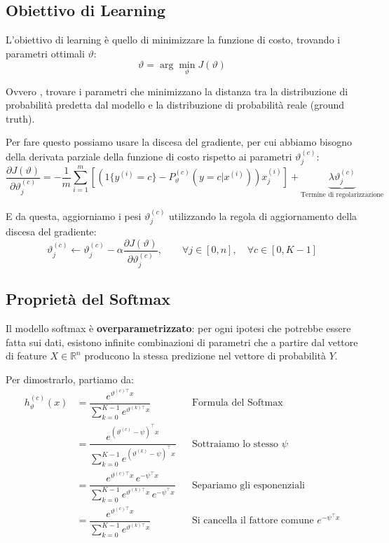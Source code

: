 \subsection{Obiettivo di Learning}
L'obiettivo di learning è quello di minimizzare la funzione di costo, trovando i parametri ottimali \(\vartheta\):
\[
\vartheta = \arg \min_{\vartheta} J(\vartheta)
\]

Ovvero , trovare i parametri che minimizzano la distanza tra la distribuzione di probabilità predetta dal modello e la distribuzione di probabilità reale (ground truth).

Per fare questo possiamo usare la discesa del gradiente, per cui abbiamo bisogno della derivata parziale della funzione di costo rispetto ai parametri \(\vartheta_j^{(c)}\):
\[
\frac{\partial J(\vartheta)}{\partial \vartheta_j^{(c)}}
=
- \frac{1}{m}
\sum_{i=1}^{m}
\left[
\left(1\{y^{(i)} = c\} - P_{\vartheta}^{(c)}(y=c | x^{(i)})\right)
x_j^{(i)}
\right]
+
\underbrace{\lambda \vartheta_j^{(c)}}_{\text{Termine di regolarizzazione}}
\]

E da questa, aggiorniamo i pesi \(\vartheta_j^{(c)}\) utilizzando la regola di aggiornamento della discesa del gradiente:
\[
\vartheta_j^{(c)} \leftarrow \vartheta_j^{(c)} - \alpha \frac{\partial J(\vartheta)}{\partial \vartheta_j^{(c)}}, \qquad \forall j \in [0, n], \quad \forall c \in [0, K-1]
\]

\subsection{Proprietà del Softmax}\label{sec:proprieta_softmax}
Il modello softmax è \textbf{overparametrizzato}: per ogni ipotesi che potrebbe essere fatta sui dati, esistono infinite combinazioni di parametri che a partire dal vettore di feature $X \in \mathbb{R}^n$ producono la stessa predizione nel vettore di probabilità $Y$.

\noindent
Per dimostrarlo, partiamo da:
\begin{align*}
h_{\vartheta}^{(c)}(x) 
&=\dfrac{e^{\vartheta^{(c)\!\top} x}}
        {\displaystyle\sum_{k=0}^{K-1} e^{\vartheta^{(k)\!\top} x}}
        && \text{Formula del Softmax} \\[4pt]
&=\dfrac{e^{(\vartheta^{(c)}-\psi)^{\!\top} x}}
        {\displaystyle\sum_{k=0}^{K-1} e^{(\vartheta^{(k)}-\psi)^{\!\top} x}}
        && \text{Sottraiamo lo stesso $\psi$} \\[4pt]
&=\dfrac{e^{\vartheta^{(c)\!\top} x}\,e^{-\psi^{\!\top} x}}
        {\displaystyle\sum_{k=0}^{K-1} e^{\vartheta^{(k)\!\top} x}\,e^{-\psi^{\!\top} x}}
        && \text{Separiamo gli esponenziali} \\[4pt]
&=\dfrac{e^{\vartheta^{(c)\!\top} x}}
        {\displaystyle\sum_{k=0}^{K-1} e^{\vartheta^{(k)\!\top} x}}
        && \text{Si cancella il fattore comune $e^{-\psi^{\!\top} x}$}
\end{align*}

